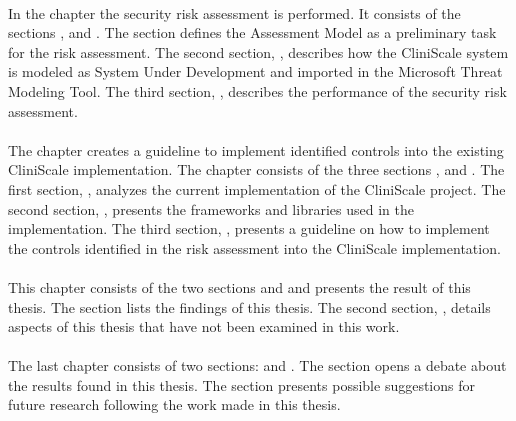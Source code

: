 \paragraph{} In the chapter \textit{} the security risk assessment is performed. It consists of the sections \textit{}, \textit{} and \textit{}. The section \textit{} defines the Assessment Model as a preliminary task for the risk assessment. The second section, \textit{}, describes how the CliniScale system is modeled as System Under Development and imported in the Microsoft Threat Modeling Tool. The third section, \textit{}, describes the performance of the security risk assessment.


\paragraph{} The chapter \textit{} creates a guideline to implement identified controls into the existing CliniScale implementation. The chapter consists of the three sections \textit{}, \textit{} and \textit{}. The first section, \textit{}, analyzes the current implementation of the CliniScale project. The second section, \textit{}, presents the frameworks and libraries used in the implementation. The third section, \textit{}, presents a guideline on how to implement the controls identified in the risk assessment into the CliniScale implementation.

\paragraph{} This chapter consists of the two sections \textit{} and \textit{} and presents the result of this thesis. The section \textit{} lists the findings of this thesis. The second section, \textit{}, details aspects of this thesis that have not been examined in this work.

\paragraph{} The last chapter \textit{} consists of two sections: \textit{} and \textit{}. The section \textit{} opens a debate about the results found in this thesis. The section \textit{} presents possible suggestions for future research following the work made in this thesis.

